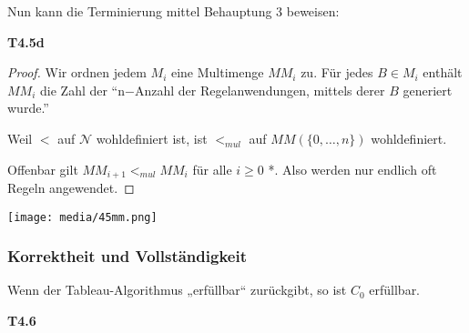 Nun kann die Terminierung mittel Behauptung 3 beweisen:

\textbf{T4.5d}

\begin{proof}
    Wir ordnen jedem $M_i$ eine Multimenge $MM_i$ zu. Für jedes $B \in M_i$ enthält $MM_i$ die Zahl der \enquote{n$-$Anzahl der Regelanwendungen, mittels derer $B$ generiert wurde.}

Weil $<$ auf $\mathcal{N}$ wohldefiniert ist, ist $<_{mul}$ auf $MM(\{0,\ldots,n\})$ wohldefiniert.

Offenbar gilt $MM_{i+1} <_{mul} MM_i$ für alle $i \geq 0$ *. Also werden nur endlich oft Regeln angewendet.
\end{proof}

\texttt{[image: media/45mm.png]}

\subsubsection{Korrektheit und Vollständigkeit}

\begin{proposition}

Wenn der Tableau-Algorithmus „erfüllbar`` zurückgibt, so ist $C_{0}$
erfüllbar.
\end{proposition}

\textbf{T4.6}

